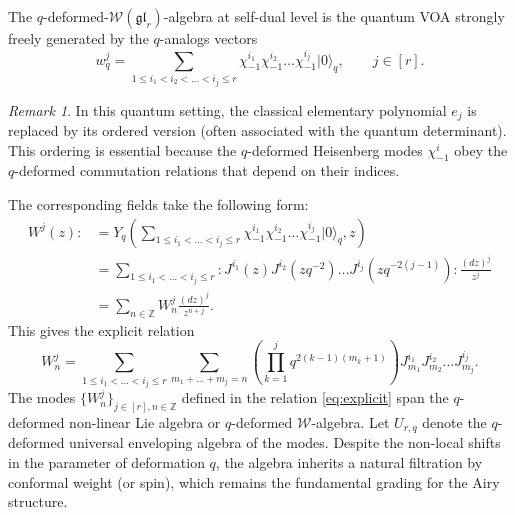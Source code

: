 \documentclass[reqno,11pt]{amsart}
\theoremstyle{plain}
\theoremstyle{definition}
\theoremstyle{remark}
\newtheorem{remark}[theorem]{Remark}
\numberwithin{equation}{section}
\newcommand{\1}{\mathds{1}}
\newcommand{\2}{\frac{1}{2}}
\begin{document}
{				The $q$-deformed-$\mathcal{W}(\mathfrak{gl}_r)$-algebra at self-dual level is the quantum VOA strongly freely generated by the $q$-analogs vectors 
				\begin{equation}\label{WrGenerators}
					w^j_q = \sum_{1 \leq i_1 < i_2 < \dots < i_j \leq r} \chi^{i_1}_{-1} \chi^{i_2}_{-1} \dots \chi^{i_j}_{-1} |0\rangle_q , \qquad j \in [r].
				\end{equation} 
				\begin{remark}
					In this quantum setting, the classical elementary polynomial $e_j$ is replaced by its ordered version (often associated with the quantum determinant). This ordering is essential because the $q$-deformed Heisenberg modes $\chi^{i}_{-1}$ obey the  $q$-deformed commutation relations that depend on their indices.
				\end{remark}
				The corresponding fields take the following form:
				\begin{align}\label{eq:expl1}
					W^j(z) :&= Y_q\left( \sum_{1 \leq i_1 < \dots < i_j \leq r} \chi^{i_1}_{-1} \chi^{i_2}_{-1} \dots \chi^{i_j}_{-1} |0 \rangle_q, z \right)\nonumber \\
					&= \sum_{1 \leq i_1 < \dots < i_j \leq r} : J^{i_1}(z) J^{i_2}(zq^{-2}) \dots J^{i_j}(zq^{-2(j-1)}) : \frac{(dz)^j}{z^j}\nonumber \\
					&= \sum_{n \in \mathbb{Z}} W^j_n \frac{(dz)^j}{z^{n+j}}.
				\end{align}
				This gives the explicit relation
				\begin{equation}\label{eq:explicit}
					W^j_n = \sum_{1 \leq i_1 < \ldots < i_j \leq r} \sum_{m_1 + \ldots + m_j = n} \left( \prod_{k=1}^j q^{2(k-1)(m_k+1)} \right) J^{i_1}_{m_1} J^{i_2}_{m_2} \dots J^{i_j}_{m_j}.
				\end{equation} 
				The modes $\{W^j_n\}_{j \in [r], n \in \mathbb{Z}}$ defined in the relation \eqref{eq:explicit} span the $q$-deformed non-linear Lie algebra or $q$-deformed $\mathcal{W}$-algebra.  Let  $U_{r,q}$ denote the $q$-deformed universal enveloping algebra of the modes. Despite the non-local shifts in the parameter of deformation $q$, the algebra inherits a natural filtration by conformal weight (or spin), which remains the fundamental grading for the Airy structure.
				
}
\end{document}
